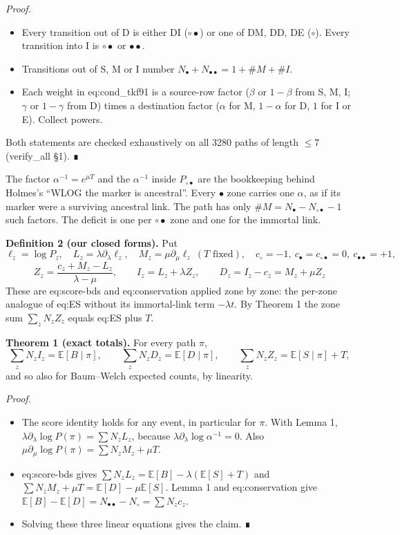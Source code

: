 \documentclass[10pt,]{article}
\providecommand{\tightlist}{%
  \setlength{\itemsep}{0pt}\setlength{\parskip}{0pt}}
\begin{document}
\emph{Proof.}

\begin{itemize}
\tightlist
\item
  Every transition out of D is either DI (\(\circ\bullet\)) or one of
  DM, DD, DE (\(\circ\)). Every transition into I is \(\circ\bullet\) or
  \(\bullet\bullet\).
\item
  Transitions out of S, M or I number
  \(N_\bullet+N_{\bullet\bullet}=1+\#M+\#I\).
\item
  Each weight in eq:cond\_tkf91 is a source-row factor (\(\beta\) or
  \(1-\beta\) from S, M, I; \(\gamma\) or \(1-\gamma\) from D) times a
  destination factor (\(\alpha\) for M, \(1-\alpha\) for D, \(1\) for I
  or E). Collect powers.
\end{itemize}

Both statements are checked exhaustively on all 3280 paths of length
\(\le7\) (verify\_all §1). ∎

The factor \(\alpha^{-1}=e^{\mu T}\) and the \(\alpha^{-1}\) inside
\(P_{\circ\bullet}\) are the bookkeeping behind Holmes's ``WLOG the
marker is ancestral''. Every \(\bullet\) zone carries one \(\alpha\), as
if its marker were a surviving ancestral link. The path has only
\(\#M=N_\bullet-N_{\circ\bullet}-1\) such factors. The deficit is one
per \(\circ\bullet\) zone and one for the immortal link.

\textbf{Definition 2 (our closed forms).} Put
\[\ell_z=\log P_z,\quad L_z=\lambda\partial_\lambda\ell_z,\quad M_z=\mu\partial_\mu\ell_z\ (T\text{ fixed}),\quad c_\circ=-1,\ c_\bullet=c_{\circ\bullet}=0,\ c_{\bullet\bullet}=+1,\]
\[\boxed{\;Z_z=\frac{c_z+M_z-L_z}{\lambda-\mu},\qquad I_z=L_z+\lambda Z_z,\qquad D_z=I_z-c_z=M_z+\mu Z_z\;}\]
These are eq:score-bds and eq:conservation applied zone by zone: the
per-zone analogue of eq:ES without its immortal-link term
\(-\lambda t\). By Theorem 1 the zone sum \(\sum_zN_zZ_z\) equals eq:ES
plus \(T\).

\textbf{Theorem 1 (exact totals).} For every path \(\pi\),
\[\sum_zN_zI_z=\mathbb E[B\mid\pi],\qquad\sum_zN_zD_z=\mathbb E[D\mid\pi],\qquad\sum_zN_zZ_z=\mathbb E[S\mid\pi]+T,\]
and so also for Baum--Welch expected counts, by linearity.

\emph{Proof.}

\begin{itemize}
\tightlist
\item
  The score identity holds for any event, in particular for \(\pi\).
  With Lemma 1, \(\lambda\partial_\lambda\log P(\pi)=\sum N_zL_z\),
  because \(\lambda\partial_\lambda\log\alpha^{-1}=0\). Also
  \(\mu\partial_\mu\log P(\pi)=\sum N_zM_z+\mu T\).
\item
  eq:score-bds gives
  \(\sum N_zL_z=\mathbb E[B]-\lambda(\mathbb E[S]+T)\) and
  \(\sum N_zM_z+\mu T=\mathbb E[D]-\mu\mathbb E[S]\). Lemma 1 and
  eq:conservation give
  \(\mathbb E[B]-\mathbb E[D]=N_{\bullet\bullet}-N_\circ=\sum N_zc_z\).
\item
  Solving these three linear equations gives the claim. ∎
\end{itemize}
\end{document}
